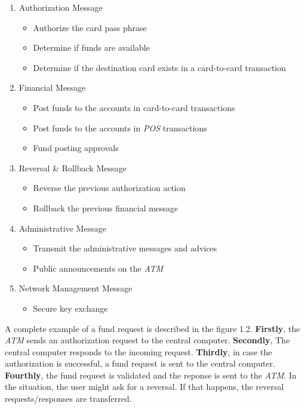 \documentclass[12pt]{article}
\numberwithin{equation}{section}
\numberwithin{table}{section}
\numberwithin{figure}{section}
\begin{document}
\begin{enumerate}
	\item{Authorization Message}
		\begin{itemize}
			\item{Authorize the card pass phrase}
			\item{Determine if funds are available}
			\item{Determine if the destination card exists in a card-to-card transaction}
		\end{itemize}
		
	\item{Financial Message}
		\begin{itemize}
			\item{Post funds to the accounts in card-to-card transactions}
			\item{Post funds to the accounts in \textit{POS} transactions}
			\item{Fund posting approvals}
		\end{itemize}
	
	\item{Reversal \& Rollback Message}
		\begin{itemize}
			\item{Reverse the previous authorization action}
			\item{Rollback the previous financial message}
		\end{itemize}
		
	\item{Administrative Message}
		\begin{itemize}
			\item{Transmit the administrative messages and advices}
			\item{Public announcements on the \textit{ATM}}
		\end{itemize}
		
	\item{Network Management Message}
		\begin{itemize}
			\item{Secure key exchange}
		\end{itemize}
	
\end{enumerate}



A complete example of a fund request is described in the figure 1.2. \textbf{Firstly}, the \textit{ATM} sends an authorization request to the central computer. \textbf{Secondly}, The central computer responds to the incoming request. \textbf{Thirdly}, in case the authorization is successful, a fund request is sent to the central computer. \textbf{Fourthly}, the fund request is validated and the reponse is sent to the \textit{ATM}. In the situation, the user might ask for a reversal. If that happens, the reversal requests/responses are transferred.
\end{document}
